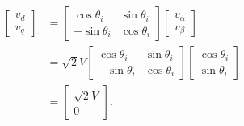 \begin{align}\label{eq:v_d_v_q}
	\begin{bmatrix}
		v_d\\v_q
	\end{bmatrix} &= \begin{bmatrix}
	\cos \theta_i & \sin \theta_i\\
	-\sin \theta_i & \cos \theta_i
	\end{bmatrix}\begin{bmatrix}
	v_{\alpha}\\v_{\beta}
	\end{bmatrix} \nonumber\\
	&= \sqrt{2}V\begin{bmatrix}
	\cos \theta_i & \sin \theta_i\\
	-\sin \theta_i & \cos \theta_i
	\end{bmatrix}\begin{bmatrix}
	\cos \theta_i\\\sin \theta_i
	\end{bmatrix} \nonumber\\
	&= \begin{bmatrix}
		\sqrt{2}V\\0
	\end{bmatrix}.
\end{align}
